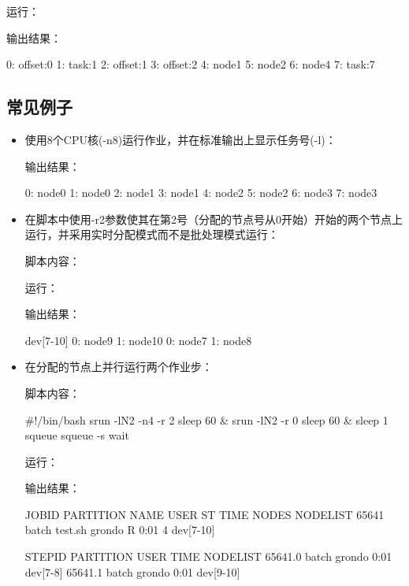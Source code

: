 运行：

输出结果：
\begin{OUT}
0: offset:0
1: task:1
2: offset:1
3: offset:2
4: node1
5: node2
6: node4
7: task:7
\end{OUT}

\subsection{常见例子}
\begin{itemize}
	\item 使用8个CPU核(-n8)运行作业，并在标准输出上显示任务号(-l)：


输出结果：
\begin{OUT}
0: node0
1: node0
2: node1
3: node1
4: node2
5: node2
6: node3
7: node3
\end{OUT}

	\item 在脚本中使用-r2参数使其在第2号（分配的节点号从0开始）开始的两个节点上运行，并采用实时分配模式而不是批处理模式运行：

脚本内容：

运行：

输出结果：
\begin{OUT}
dev[7-10]
0: node9
1: node10
0: node7
1: node8
\end{OUT}

\item 在分配的节点上并行运行两个作业步：

脚本内容：
\begin{SH}
#!/bin/bash
srun -lN2 -n4 -r 2 sleep 60 &
srun -lN2 -r 0 sleep 60 &
sleep 1
squeue
squeue -s
wait
\end{SH}

运行：

输出结果：
\begin{OUT}
  JOBID PARTITION     NAME     USER  ST      TIME  NODES NODELIST
  65641     batch  test.sh   grondo   R      0:01      4 dev[7-10]

STEPID     PARTITION     USER      TIME NODELIST
65641.0        batch   grondo      0:01 dev[7-8]
65641.1        batch   grondo      0:01 dev[9-10]
\end{OUT}


\end{itemize}
